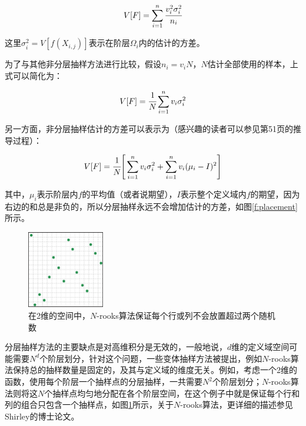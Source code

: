 \begin{equation}
	V[F]=\sum_{i=1}^{n} \cfrac{v_{i}^2 \sigma_{i}^2}{n_i}
\end{equation}

\noindent 这里$\sigma_{i}^2=V[f(X_{i,j})]$表示在阶层$\Omega_i$内的估计的方差。

为了与其他非分层抽样方法进行比较，假设$n_i=v_iN$，$N$估计全部使用的样本，上式可以简化为：

\begin{equation}
	V[F]= \cfrac{1}{N}\sum_{i=1}^{n}v_{i} \sigma_{i}^2
\end{equation}

\noindent 另一方面，非分层抽样估计的方差可以表示为（感兴趣的读者可以参见\cite{a:RobustMonteCarloMethodsforLightTransportSimulation}第51页的推导过程）：

\begin{equation}
	V[F]= \cfrac{1}{N}\Bigg[ \sum_{i=1}^{n}v_{i} \sigma_{i}^2 +\sum_{i=1}^{n}v_i(\mu_i-I)^2   \Bigg]
\end{equation}

\noindent 其中，$\mu_i$表示阶层内$f$的平均值（或者说期望），$I$表示整个定义域内$f$的期望，因为右边的和总是非负的，所以分层抽样永远不会增加估计的方差，如图\ref{f:placement}所示。

\begin{figure}
\sidecaption
	\includegraphics[width=0.3\textwidth]{figures/mc/mc-12-3}
	\caption{在2维的空间中，$N$-rooks算法保证每个行或列不会放置超过两个随机数}
	\label{f:n-rooks}
\end{figure}

分层抽样方法的主要缺点是对高维积分是无效的，一般地说，$d$维的定义域空间可能需要$N^d$个阶层划分，针对这个问题，一些变体抽样方法被提出，例如$N$-rooks算法保持总的抽样数量是固定的，及其与定义域的维度无关。例如，考虑一个2维的函数，使用每个阶层一个抽样点的分层抽样，一共需要$N^2$个阶层划分；$N$-rooks算法则将这$N$个抽样点均匀地分配在各个阶层空间，在这个例子中就是保证每个行和列的组合只包含一个抽样点，如图\ref{f:n-rooks}所示，关于$N$-rooks算法，更详细的描述参见Shirley的博士论文\cite{a:PhysicallyBasedLightingCalculationsForComputerGraphics}。

